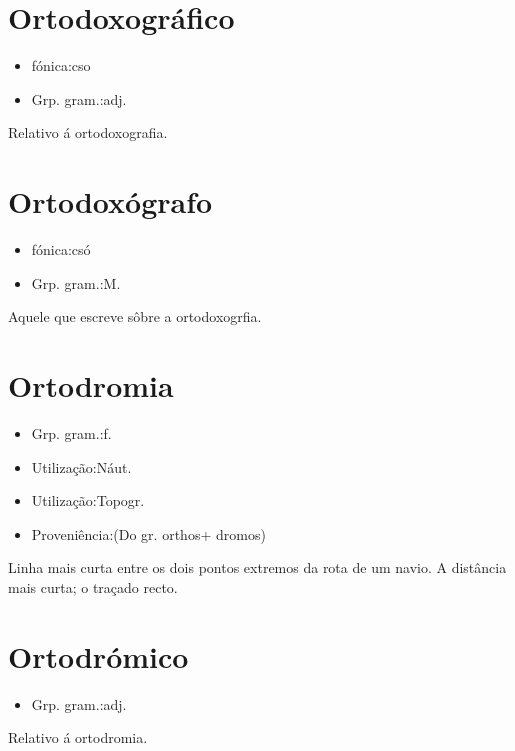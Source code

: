 \section{Ortodoxográfico}
\begin{itemize}
\item {fónica:cso}
\end{itemize}
\begin{itemize}
\item {Grp. gram.:adj.}
\end{itemize}
Relativo á ortodoxografia.
\section{Ortodoxógrafo}
\begin{itemize}
\item {fónica:csó}
\end{itemize}
\begin{itemize}
\item {Grp. gram.:M.}
\end{itemize}
Aquele que escreve sôbre a ortodoxogrfia.
\section{Ortodromia}
\begin{itemize}
\item {Grp. gram.:f.}
\end{itemize}
\begin{itemize}
\item {Utilização:Náut.}
\end{itemize}
\begin{itemize}
\item {Utilização:Topogr.}
\end{itemize}
\begin{itemize}
\item {Proveniência:(Do gr. \textunderscore orthos\textunderscore  + \textunderscore dromos\textunderscore )}
\end{itemize}
Linha mais curta entre os dois pontos extremos da rota de um navio.
A distância mais curta; o traçado recto.
\section{Ortodrómico}
\begin{itemize}
\item {Grp. gram.:adj.}
\end{itemize}
Relativo á ortodromia.
